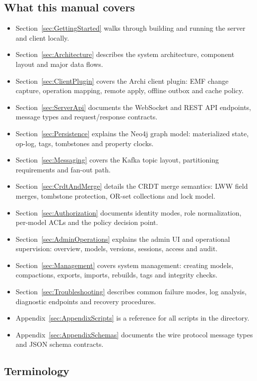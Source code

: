 \subsection{What this manual covers}

\begin{itemize}
\item Section~\ref{sec:GettingStarted} walks through building and running the
  server and client locally.
\item Section~\ref{sec:Architecture} describes the system architecture, component
  layout and major data flows.
\item Section~\ref{sec:ClientPlugin} covers the Archi client plugin: EMF change
  capture, operation mapping, remote apply, offline outbox and cache policy.
\item Section~\ref{sec:ServerApi} documents the WebSocket and REST API
  endpoints, message types and request/response contracts.
\item Section~\ref{sec:Persistence} explains the Neo4j graph model:
  materialized state, op-log, tags, tombstones and property clocks.
\item Section~\ref{sec:Messaging} covers the Kafka topic layout, partitioning
  requirements and fan-out path.
\item Section~\ref{sec:CrdtAndMerge} details the CRDT merge semantics:
  LWW field merges, tombstone protection, OR-set collections and lock model.
\item Section~\ref{sec:Authorization} documents identity modes, role
  normalization, per-model ACLs and the policy decision point.
\item Section~\ref{sec:AdminOperations} explains the admin UI and operational
  supervision: overview, models, versions, sessions, access and audit.
\item Section~\ref{sec:Management} covers system management: creating models,
  compactions, exports, imports, rebuilds, tags and integrity checks.
\item Section~\ref{sec:Troubleshooting} describes common failure modes, log
  analysis, diagnostic endpoints and recovery procedures.
\item Appendix~\ref{sec:AppendixScripts} is a reference for all scripts in the
   directory.
\item Appendix~\ref{sec:AppendixSchemas} documents the wire protocol message
  types and JSON schema contracts.
\end{itemize}

\subsection{Terminology}

